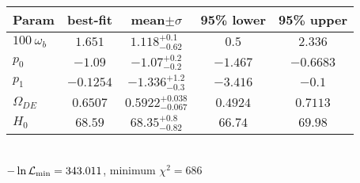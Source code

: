 \begin{tabular}{|l|c|c|c|c|} 
 \hline 
Param & best-fit & mean$\pm\sigma$ & 95\% lower & 95\% upper \\ \hline 
$100~\omega_{b }$ &$1.651$ & $1.118_{-0.62}^{+0.1}$ & $0.5$ & $2.336$ \\ 
$p_{0 }$ &$-1.09$ & $-1.07_{-0.2}^{+0.2}$ & $-1.467$ & $-0.6683$ \\ 
$p_{1 }$ &$-0.1254$ & $-1.336_{-0.3}^{+1.2}$ & $-3.416$ & $-0.1$ \\ 
$\Omega_{DE}$ &$0.6507$ & $0.5922_{-0.067}^{+0.038}$ & $0.4924$ & $0.7113$ \\ 
$H_{0 }$ &$68.59$ & $68.35_{-0.82}^{+0.8}$ & $66.74$ & $69.98$ \\ 
\hline 
 \end{tabular} \\ 
$-\ln{\cal L}_\mathrm{min} =343.011$, minimum $\chi^2=686$ \\ 
